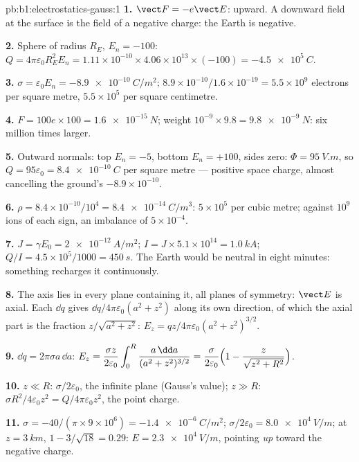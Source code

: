 \begin{solution}{pb:b1:electrostatics-gauss:1}
\textbf{1.} $\vect F = -e\vect E$: upward. A downward field at the surface
is the field of a negative charge: the Earth is negative.

\textbf{2.} Sphere of radius $R_E$, $E_n = -100$: $Q = 4\pi\varepsilon_0R_E^2E_n =
1.11 \times 10^{-10} \times 4.06 \times 10^{13} \times (-100) = \qty{-4.5e5}{C}$.

\textbf{3.} $\sigma = \varepsilon_0E_n = \qty{-8.9e-10}{C/m^2}$; $8.9 \times 10^{-10}/1.6 \times
10^{-19} = 5.5 \times 10^9$ electrons per square metre, $5.5 \times 10^5$ per
square centimetre.

\textbf{4.} $F = 100e \times 100 = \qty{1.6e-15}{N}$; weight $10^{-9} \times 9.8 =
\qty{9.8e-9}{N}$: six million times larger.

\textbf{5.} Outward normals: top $E_n = -5$, bottom $E_n = +100$, sides
zero: $\Phi = \qty{95}{V.m}$, so $Q = 95\varepsilon_0 = \qty{+8.4e-10}{C}$ per square
metre --- positive space charge, almost cancelling the ground's
$-8.9 \times 10^{-10}$.

\textbf{6.} $\rho = 8.4 \times 10^{-10}/10^4 = \qty{8.4e-14}{C/m^3}$: $5 \times 10^5$
 per cubic metre; against $10^9$ ions of each sign,
an imbalance of $5 \times 10^{-4}$.

\textbf{7.} $J = \gamma E_0 = \qty{2e-12}{A/m^2}$; $I = J \times 5.1 \times 10^{14} =
\qty{1.0}{kA}$; $Q/I = 4.5 \times 10^5/1000 = \qty{450}{s}$. The Earth would be
neutral in eight minutes: something recharges it continuously.

\textbf{8.} The axis lies in every plane containing it, all planes of
symmetry: $\vect E$ is axial. Each $\dd q$ gives $\dd q/4\pi\varepsilon_0(a^2 + z^2)$
along its own direction, of which the axial part is the fraction
$z/\sqrt{a^2 + z^2}$: $E_z = qz/4\pi\varepsilon_0(a^2 + z^2)^{3/2}$.

\textbf{9.} $\dd q = 2\pi\sigma a\,\dd a$: $E_z = \dfrac{\sigma z}{2\varepsilon_0}\displaystyle\int_0^R
\dfrac{a\,\dd a}{(a^2 + z^2)^{3/2}} = \dfrac{\sigma}{2\varepsilon_0}\Bigl(1 - \dfrac{z}{\sqrt{z^2
+ R^2}}\Bigr)$.

\textbf{10.} $z \ll R$: $\sigma/2\varepsilon_0$, the infinite plane (Gauss's value);
$z \gg R$: $\sigma R^2/4\varepsilon_0z^2 = Q/4\pi\varepsilon_0z^2$, the point charge.

\textbf{11.} $\sigma = -40/(\pi \times 9 \times 10^6) = \qty{-1.4e-6}{C/m^2}$; $\sigma/2\varepsilon_0 =
\qty{8.0e4}{V/m}$; at $z = \qty{3}{km}$, $1 - 3/\sqrt{18} = 0.29$: $E =
\qty{2.3e4}{V/m}$, pointing \emph{up} toward the negative charge.


\end{solution}
